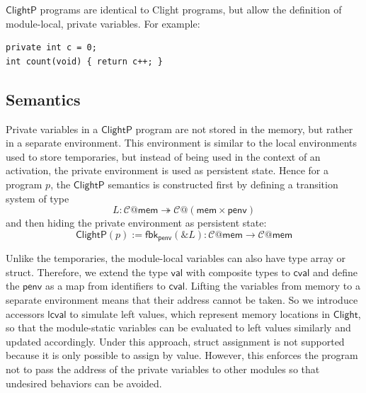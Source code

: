 \documentclass[acmsmall,screen,review,anonymous]{acmart}
\newcommand{\kw}[1]{\ensuremath{ \mathsf{#1} }}
\newcommand{\ClightP}{\ensuremath{ \mathsf{ClightP} }}
\newcommand{\Clight}{\ensuremath{ \mathsf{Clight} }}
\begin{document}
\ClightP{} programs are identical to Clight programs,
but allow the definition of module-local, private variables.
For example:

\begin{verbatim}
private int c = 0;
int count(void) { return c++; }
\end{verbatim}


\subsection{Semantics}

Private variables in a \ClightP{} program
are not stored in the memory,
but rather in a separate environment.
This environment is similar to
the local environments used to store temporaries,
but instead of being used in the context of an activation,
the private environment is used as persistent state.
Hence for a program $p$, the \ClightP{} semantics is constructed
first by defining a transition system of type
\[
  L : \mathcal{C}@\mathsf{mem} \twoheadrightarrow
      \mathcal{C}@(\mathsf{mem}\times\mathsf{penv})
\]
and then hiding the private environment as persistent state:
\[
  \ClightP{}(p) := \mathsf{fbk}_\mathsf{penv}(\&L) :
    \mathcal{C}@\mathsf{mem} \rightarrow
    \mathcal{C}@\mathsf{mem}
\]


Unlike the temporaries,
the module-local variables can also have type array or struct.
Therefore, we extend the type $\kw{val}$ with composite types to $\kw{cval}$
and define the $\kw{penv}$ as a map from identifiers to $\kw{cval}$.
Lifting the variables from memory to a separate environment
means that their address cannot be taken.
So we introduce accessors $\kw{lcval}$ to simulate left values,
which represent memory locations in $\Clight$,
so that the module-static variables can be evaluated to left values similarly
and updated accordingly.
Under this approach, struct assignment is not supported
because it is only possible to assign by value.
However, this enforces the program not to pass the address
of the private variables to other modules
so that undesired behaviors can be avoided.
\end{document}
